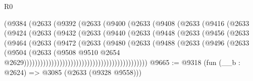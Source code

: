 \begin{lexlean}{R0}
\begin{coremodule}
                            (@9384
                              (@2633
                                (@9392
                                  (@2633
                                    (@9400
                                      (@2633
                                        (@9408
                                          (@2633
                                            (@9416
                                              (@2633
                                                (@9424
                                                  (@2633
                                                    (@9432
                                                      (@2633
                                                        (@9440
                                                          (@2633
                                                            (@9448
                                                              (@2633
                                                                (@9456
                                                                  (@2633
                                                                    (@9464
                                                                      (@2633
                                                                        (@9472
                                                                          (@2633
                                                                            (@9480
                                                                              (@2633
                                                                                (@9488
                                                                                  (@2633
                                                                                    (@9496
                                                                                      (@2633
                                                                                        (@9504
                                                                                          (@2633
                                                                                            (@9508
                                                                                              @9510
                                                                                              @2654
                                                                                              @2629)))))))))))))))))))))))))))))))))))))))))))))
@9665 := @9318
    (fun (__b : @2624) => @3085 (@2633 (@9328 @9558)))

\end{coremodule}
\end{lexlean}
